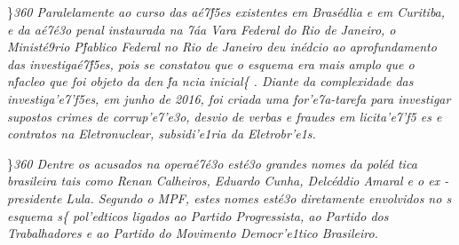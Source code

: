 \par \}\pard \ltrpar\qj {}\sl360\widctlpar\wrapdefault\aspalpha\aspnum\faauto\adjustright{} {\rtlch{}  \ltrch{}   Paralelamente ao curso }{
\rtlch{}  \ltrch{}  das a\'e7\'f5es existentes em Bras\'edlia e em Curitiba, e da }{\rtlch{}  \ltrch{}  a\'e7\'e3o penal }{\rtlch{}  \ltrch{}  instaurada }{
\rtlch{}  \ltrch{}  na 7\'aa Vara Federal do Rio de Janeiro, o Minist\'e9rio P\'fablico Federal no Rio de Janeiro deu in\'edcio ao aprofundamento das investiga\'e7\'f5es, pois }{\rtlch{}  \ltrch{} 
 se }{\rtlch{}  \ltrch{}  constatou que o esquema era mais amplo que o n\'facleo }{\rtlch{}  \ltrch{}  que foi objeto da }{\rtlch{}  \ltrch{} 
 den}{\rtlch{}  \ltrch{}  \'fa}{\rtlch{}  \ltrch{}  ncia}{\rtlch{}  \ltrch{}   inicial}\{\rtlch{}
 \ltrch{}  . Diante da
complexidade das investiga'e7'f5es, em junho de 2016, foi criada uma
for'e7a-tarefa para investigar supostos crimes de corrup'e7'e3o, desvio
de verbas e fraudes em licita'e7'f5 es e contratos na Eletronuclear,
subsidi'e1ria da Eletrobr'e1s.
\par \}\pard \ltrpar\qj {}\sl360\widctlpar\wrapdefault\faauto{} {\rtlch{}  \ltrch{}   Dentre os acusados na opera\'e7\'e3o est\'e3o grandes nomes da pol\'ed
tica brasileira tais como Renan Calheiros, Eduardo Cunha, Delc\'eddio Amaral e o ex}{\rtlch{}  \ltrch{}  -}{\rtlch{}  \ltrch{}  presidente Lula. }{\rtlch{}  \ltrch{} 
 Segundo o MPF, estes nomes}{\rtlch{}  \ltrch{}   est\'e3o diretamente envolvidos no}{\rtlch{}  \ltrch{}  s}{\rtlch{}  \ltrch{}  
 esquema}{\rtlch{}  \ltrch{}  s}\{\rtlch{}
 \ltrch{}  pol'edticos ligados ao
Partido Progressista, ao Partido dos Trabalhadores e ao Partido do
Movimento Democr'e1tico Brasileiro.

